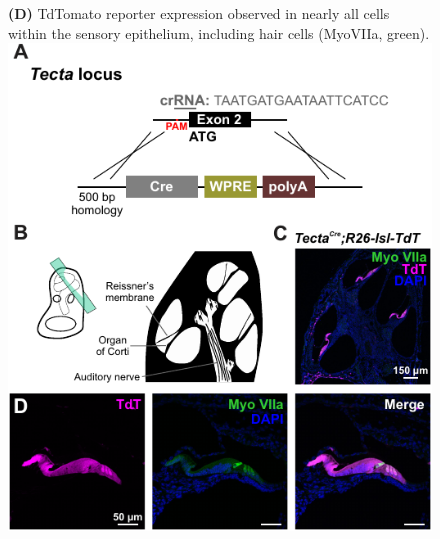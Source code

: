 \documentclass[9pt,lineno]{elife}
\begin{document}
\begin{figure} [t!]
\begin{fullwidth}
{\textbf{(D)} TdTomato reporter expression observed in nearly all cells within the sensory epithelium, including hair cells (MyoVIIa, green).
}
{\includegraphics[width=.63\linewidth]{figures/Fig4p1.pdf}}\label{figsupp:sf4p1}
\end{fullwidth}
\end{figure}
\end{document}

